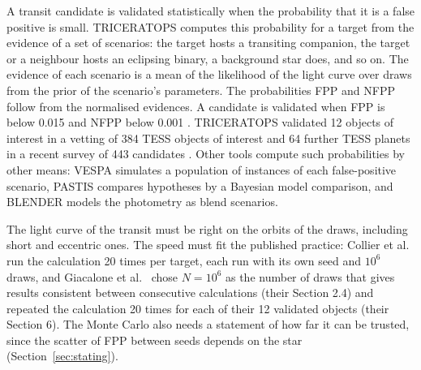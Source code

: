 \documentclass[11pt]{article}
\begin{document}
A transit candidate is validated statistically when the probability that it is a false positive is small. TRICERATOPS \cite{giacalone2021} computes this probability for a target from the evidence of a set of scenarios: the target hosts a transiting companion, the target or a neighbour hosts an eclipsing binary, a background star does, and so on. The evidence of each scenario is a mean of the likelihood of the light curve over draws from the prior of the scenario's parameters. The probabilities FPP and NFPP follow from the normalised evidences. A candidate is validated when FPP is below 0.015 and NFPP below 0.001 \cite{giacalone2021}. TRICERATOPS validated 12 objects of interest in a vetting of 384 TESS objects of interest \cite{giacalone2021} and 64 further TESS planets in a recent survey of 443 candidates \cite{collier2026}. Other tools compute such probabilities by other means: VESPA \cite{morton2012,morton2016} simulates a population of instances of each false-positive scenario, PASTIS \cite{diaz2014} compares hypotheses by a Bayesian model comparison, and BLENDER \cite{torres2011} models the photometry as blend scenarios.

The light curve of the transit must be right on the orbits of the draws, including short and eccentric ones. The speed must fit the published practice: Collier et al.\ \cite{collier2026} run the calculation 20 times per target, each run with its own seed and $10^{6}$ draws, and Giacalone et al.\ \cite{giacalone2021} chose $N=10^{6}$ as the number of draws that gives results consistent between consecutive calculations (their Section 2.4) and repeated the calculation 20 times for each of their 12 validated objects (their Section 6). The Monte Carlo also needs a statement of how far it can be trusted, since the scatter of FPP between seeds depends on the star (Section~\ref{sec:stating}).
\end{document}

